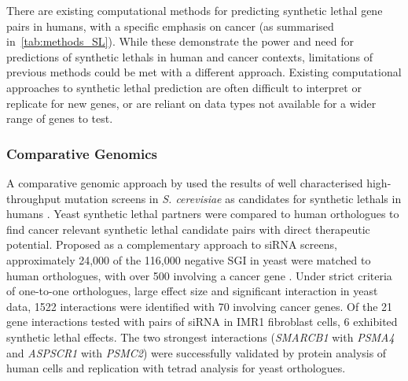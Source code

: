 There are existing computational methods for predicting \gls{synthetic lethal} gene pairs in humans, with a specific emphasis on cancer (as summarised in~\ref{tab:methods_SL}). While these demonstrate the power and need for predictions of \glspl{synthetic lethal} in human and cancer contexts, limitations of previous methods could be met with a different approach. Existing computational approaches to \gls{synthetic lethal} prediction are often difficult to interpret or replicate for new genes, or are reliant on data types not available for a wider range of genes to test.  

\subsubsection{Comparative Genomics}

A comparative \gls{genomic} approach by \citet{Deshpande2013} used the results of well characterised high-throughput \gls{mutation} screens in \textit{S. cerevisiae} as candidates for \glspl{synthetic lethal} in humans \citep{Baryshnikova2010a, Costanzo2010, Costanzo2011, Tong2001, Tong2004}. Yeast \gls{synthetic lethal} partners were compared to human orthologues to find cancer relevant \gls{synthetic lethal} candidate pairs with direct therapeutic potential. Proposed as a complementary approach to \gls{siRNA} screens, approximately 24,000 of the 116,000 negative \gls{SGI} in yeast \citep{Costanzo2011} were matched to human orthologues, with over 500 involving a \gls{cancer gene} \citep{Futreal2004}. Under strict criteria of one-to-one orthologues, large effect size %
and significant interaction %
in yeast data, 1522 interactions were identified with 70 involving \glspl{cancer gene}. Of the 21 gene interactions tested with pairs of \gls{siRNA} in IMR1 fibroblast cells, 6 exhibited \gls{synthetic lethal} effects. The two strongest interactions (\textit{SMARCB1} with \textit{PSMA4} and \textit{ASPSCR1} with \textit{PSMC2}) were successfully validated by protein analysis of human cells and replication with tetrad analysis for yeast orthologues.


